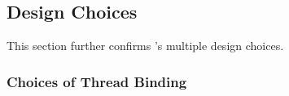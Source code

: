 
 

\subsection{Design Choices}
\label{sec:design}

This section further confirms \NM{}'s multiple design choices.

\subsubsection{Choices of Thread Binding}
\label{sec: threadbinding}


